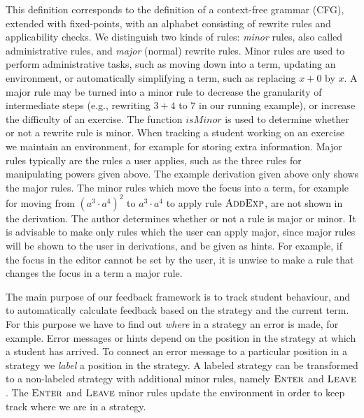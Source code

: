 \documentclass[copyright]{eptcs}
\newcommand{\Varid}[1]{\mathit{#1}}
\begin{document}
This definition corresponds to the definition of a context-free grammar (CFG),
extended with fixed-points, with an alphabet consisting of rewrite rules and
applicability checks. We distinguish two kinds of rules: \emph{minor} rules,
also called administrative rules, and \emph{major} (normal) rewrite rules. Minor
rules are used to perform administrative tasks, such as moving down into a term,
updating an environment, or automatically simplifying a term, such as replacing
\ensuremath{\Varid{x}\mathbin{+}\mathrm{0}} by \ensuremath{\Varid{x}}. A major rule may be turned into a minor rule to decrease the
granularity of intermediate steps (e.g., rewriting \ensuremath{\mathrm{3}\mathbin{+}\mathrm{4}} to \ensuremath{\mathrm{7}} in our running
example), or increase the difficulty of an exercise.  The function \ensuremath{\Varid{isMinor}} is
used to determine whether or not a rewrite rule is minor. When tracking a
student working on an exercise we maintain an environment, for example for
storing extra information. Major rules typically are the rules a user applies,
such as the three rules for manipulating powers given above. The example
derivation given above only shows the major rules. The minor rules which move
the focus into a term, for example for moving from \ensuremath{{({\Varid{a}^{\mathrm{3}}}\cdot{\Varid{a}^{\mathrm{4}}})^{\mathrm{2}}}} to \ensuremath{{\Varid{a}^{\mathrm{3}}}\cdot{\Varid{a}^{\mathrm{4}}}} to apply rule \ensuremath{\textsc{AddExp}}, are not shown in
the derivation. The author determines whether or not a rule is major or
minor. It is advisable to make only rules which the user can apply major, since
major rules will be shown to the user in derivations, and be given as hints. For
example, if the focus in the editor cannot be set by the user, it is unwise to
make a rule that changes the focus in a term a major rule.

The main purpose of our feedback framework is to track student behaviour, and to
automatically calculate feedback based on the strategy and the current term. For
this purpose we have to find out \emph{where} in a strategy an error is made,
for example. Error messages or hints depend on the position in the strategy at
which a student has arrived. To connect an error message to a particular position
in a strategy we \emph{label} a position in the strategy. A labeled strategy can
be transformed to a non-labeled strategy with additional minor rules, namely
\ensuremath{\textsc{Enter}} and \ensuremath{\textsc{Leave}}. The \ensuremath{\textsc{Enter}} and \ensuremath{\textsc{Leave}} minor rules update the environment
in order to keep track where we are in a strategy.
\end{document}
